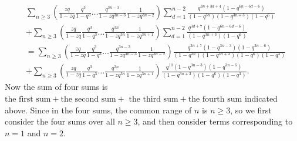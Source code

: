 \documentclass[draft]{amsart}
\numberwithin{equation}{section}
\theoremstyle{plain}
\theoremstyle{remark}
\begin{document}
\begin{align*}
&\sum_{n\geq 3}\left(\frac{zq}{1-zq}\frac{q^{3}}{1-q^{3}}\dots\frac{q^{3n-3}}{1-zq^{3n-3}}\frac{1}{1-zq^{3n-2}}\right)\sum_{d=1}^{n-2}\frac{q^{3n+3d+4}(1-q^{6n-6d-6})}{(1-q^{3n})(1-q^{3n+3})(1-q^{6})}\\
&+\sum_{n\geq 3}\left(\frac{zq}{1-zq}\frac{q^{3}}{1-q^{3}}\dots\frac{q^{3n}}{1-zq^{3n}}\frac{1}{1-zq^{3n+1}}\right)\sum_{d=1}^{n-2}\frac{q^{3d+7}(1-q^{6n-6d-6})}{(1-q^{3n+3})(1-q^{6})}\\
&=\sum_{n\geq 3}\left(\frac{zq}{1-zq}\frac{q^{3}}{1-q^{3}}\dots\frac{q^{3n-3}}{1-zq^{3n-3}}\frac{1}{1-zq^{3n-2}}\right)\frac{q^{3n+7}(1-q^{3n-3})(1-q^{3n-6})}{(1-q^{3n})(1-q^{3n+3})(1-q^{6})(1-q^{3})}  \\
&+\sum_{n\geq 3}\left(\frac{zq}{1-zq}\frac{q^{3}}{1-q^{3}}\dots\frac{q^{3n}}{1-zq^{3n}}\frac{1}{1-zq^{3n+1}}\right)\frac{q^{10}(1-q^{3n-3})(1-q^{3n-6})}{(1-q^{3n+3})(1-q^{6})(1-q^{3})}.
\end{align*}
Now the sum of four sums is 
$
\mbox{the first sum} + \mbox{the second sum} +\mbox{ the third sum} +\mbox{the fourth sum}
$ indicated above. Since in the four sums,  the common range of $n$ is $n\geq 3$, so we first consider the four sums over all  $n\geq 3$, and then consider terms corresponding to $n=1$ and $n=2$.
\end{document}
